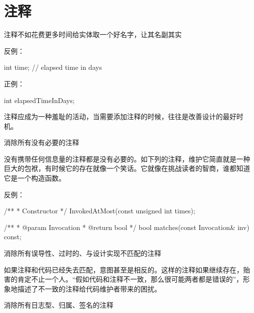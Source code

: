 \section{注释}
\begin{content}

\begin{regulation}
注释不如花费更多时间给实体取一个好名字，让其名副其实
\end{regulation}

反例：
\begin{leftbar}
\begin{c++}
int time; // elapsed time in days
\end{c++}
\end{leftbar}

正例：
\begin{leftbar}
\begin{c++}
int elapsedTimeInDays;
\end{c++}
\end{leftbar}

注释应成为一种羞耻的活动，当需要添加注释的时候，往往是改善设计的最好时机。

\begin{regulation}
消除所有没有必要的注释
\end{regulation}

没有携带任何信息量的注释都是没有必要的。如下列的注释，维护它简直就是一种巨大的包袱，有时候它的存在就像一个笑话。它就像在挑战读者的智商，谁都知道它是一个构造函数。

反例：
\begin{leftbar}
\begin{c++}
/**
 * Constructor
 */
InvokedAtMost(const unsigned int times);

/**
 * @param Invocation
 * @return bool
 */
bool matches(const Invocation& inv) const;
\end{c++}
\end{leftbar}

\begin{regulation}
消除所有误导性、过时的、与设计实现不匹配的注释
\end{regulation}

如果注释和代码已经失去匹配，意图甚至是相反的。这样的注释如果继续存在，贻害的肯定不止一个人。“假如代码和注释不一致，那么很可能两者都是错误的”，形象地描述了不一致的注释给代码维护者带来的困扰。

\begin{regulation}
消除所有日志型、归属、签名的注释
\end{regulation}


\end{content}
